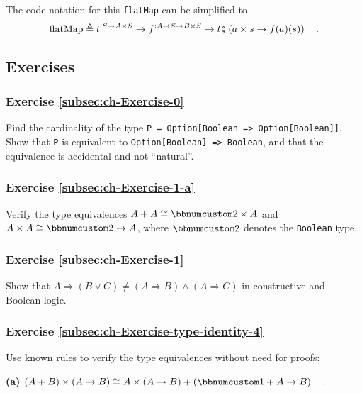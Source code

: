 The code notation for this \lstinline!flatMap! can be simplified
to
\[
\text{flatMap}\triangleq t^{:S\rightarrow A\times S}\rightarrow f^{:A\rightarrow S\rightarrow B\times S}\rightarrow t\bef\left(a\times s\rightarrow f(a)(s)\right)\quad.
\]


\subsection{Exercises}

\subsubsection{Exercise \label{subsec:ch-Exercise-0}\ref{subsec:ch-Exercise-0}}

Find the cardinality of the type \lstinline!P = Option[Boolean => Option[Boolean]]!.
Show that \lstinline!P! is equivalent to \lstinline!Option[Boolean] => Boolean!,
and that the equivalence is accidental
and not \textsf{``}natural\textsf{''}.

\subsubsection{Exercise \label{subsec:ch-Exercise-1-a}\ref{subsec:ch-Exercise-1-a}}

Verify the type equivalences $A+A\cong\bbnum 2\times A$ and $A\times A\cong\bbnum 2\rightarrow A$,
where $\bbnum 2$ denotes the \lstinline!Boolean! type.

\subsubsection{Exercise \label{subsec:ch-Exercise-1}\ref{subsec:ch-Exercise-1}}

Show that $A\Rightarrow(B\vee C)\neq(A\Rightarrow B)\wedge(A\Rightarrow C)$
in constructive and Boolean logic.

\subsubsection{Exercise \label{subsec:ch-Exercise-type-identity-4}\ref{subsec:ch-Exercise-type-identity-4}}

Use known rules to verify the type equivalences without need for proofs:

\textbf{(a)} $\left(A+B\right)\times\left(A\rightarrow B\right)\cong A\times\left(A\rightarrow B\right)+\left(\bbnum 1+A\rightarrow B\right)\quad.$

